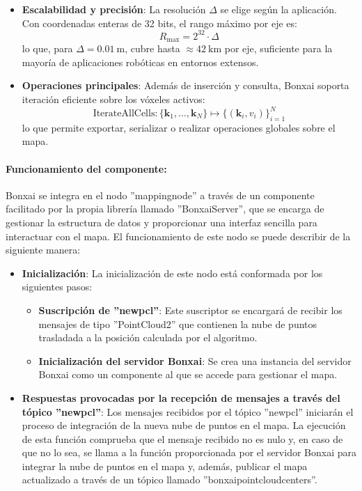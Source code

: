 \documentclass[12pt, a4paper, twoside]{article}
\begin{document}
\begin{itemize}
  (ESDF), probabilidades bayesianas de ocupación, valores de intensidad o información semántica.
  \item \textbf{Escalabilidad y precisión}:  
  La resolución \(\Delta\) se elige según la aplicación. Con coordenadas enteras de 32 bits, el rango máximo por eje es:
  \[
  R_{\max} = 2^{32} \cdot \Delta
  \]
  lo que, para \(\Delta = 0.01\ \mathrm{m}\), cubre hasta \(\approx 42\ \mathrm{km}\) por eje, suficiente para la mayoría de aplicaciones robóticas en entornos extensos.
  \item \textbf{Operaciones principales}:  
  Además de inserción y consulta, Bonxai\cite{faconti2024bonxai} soporta iteración eficiente sobre los vóxeles activos:
  \[
  \text{IterateAllCells} : \{\mathbf{k}_1, \dots, \mathbf{k}_N\} \mapsto 
  \{(\mathbf{k}_i, v_i)\}_{i=1}^{N}
  \]
  lo que permite exportar, serializar o realizar operaciones globales sobre el mapa.
\end{itemize}

\paragraph{Funcionamiento del componente:}
Bonxai\cite{faconti2024bonxai} se integra en el nodo ''mapping\textunderscore node'' a través de un componente facilitado por la propia librería llamado ''BonxaiServer'', que se encarga de gestionar
la estructura de datos y proporcionar una interfaz sencilla para interactuar con el mapa. El funcionamiento de este nodo se puede describir de la siguiente manera:
\begin{itemize}
  \item \textbf{Inicialización}: La inicialización de este nodo está conformada por los siguientes pasos:
  \begin{itemize}
    \item \textbf{Suscripción de ''new\textunderscore pcl''}: Este suscriptor se encargará de recibir los mensajes de tipo ''PointCloud2'' que contienen la nube de puntos 
    trasladada a la posición calculada por el algoritmo.
    \item \textbf{Inicialización del servidor Bonxai\cite{faconti2024bonxai}}: Se crea una instancia del servidor Bonxai\cite{faconti2024bonxai} como un componente al que se accede para gestionar el mapa.
  \end{itemize}
  \item \textbf{Respuestas provocadas por la recepción de mensajes a través del tópico ''new\textunderscore pcl''}:
  Los mensajes recibidos por el tópico ''new\textunderscore pcl'' iniciarán el proceso de integración de la nueva nube de puntos en el mapa. 
  La ejecución de esta función comprueba que el mensaje recibido no es nulo y, en caso de que no lo sea, se llama a la función proporcionada por el servidor Bonxai\cite{faconti2024bonxai}
  para integrar la nube de puntos en el mapa y, además, publicar el mapa actualizado a través de un tópico llamado ''bonxai\textunderscore point\textunderscore cloud\textunderscore centers''.
\end{itemize}
\end{document}
